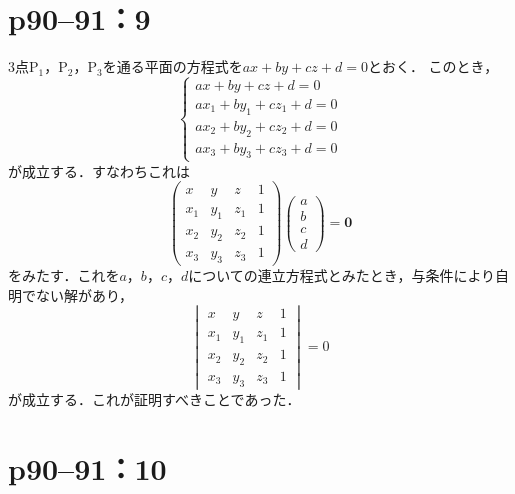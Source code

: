 \section*{p90--91：9}

\begin{tproof}
  3点$\mathrm{P}_1$，$\mathrm{P_2}$，$\mathrm{P_3}$を通る平面の方程式を$ax+by+cz+d=0$とおく．
  このとき，
  \[
    \begin{cases}
      ax+by+cz + d =0         \\
      ax_1 + by_1 +cz_1 +d =0 \\
      ax_2 + by_2 +cz_2 +d =0 \\
      ax_3 + by_3 +cz_3 +d =0
    \end{cases}
  \]
  が成立する．すなわちこれは
  \[
    \begin{pmatrix}
      x   & y   & z   & 1 \\
      x_1 & y_1 & z_1 & 1 \\
      x_2 & y_2 & z_2 & 1 \\
      x_3 & y_3 & z_3 & 1
    \end{pmatrix}
    \begin{pmatrix}
      a \\
      b \\
      c \\
      d
    \end{pmatrix}
    = \bm{0}
  \]
  をみたす．これを$a$，$b$，$c$，$d$についての連立方程式とみたとき，与条件により自明でない解があり，
  \[
    \begin{vmatrix}
      x   & y   & z   & 1 \\
      x_1 & y_1 & z_1 & 1 \\
      x_2 & y_2 & z_2 & 1 \\
      x_3 & y_3 & z_3 & 1
    \end{vmatrix}
    =0
  \]
  が成立する．これが証明すべきことであった．
\end{tproof}



\section*{p90--91：10}

